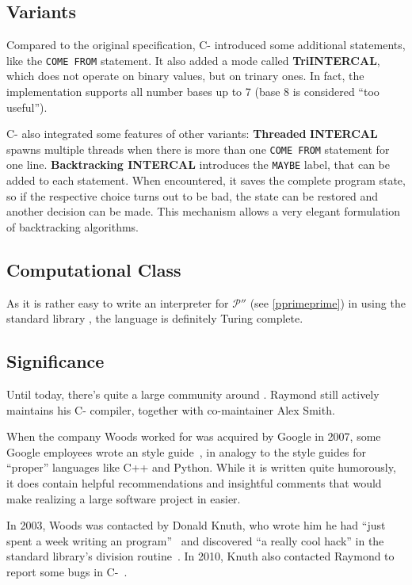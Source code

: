 \subsection{Variants}
\label{intercal-variants}

Compared to the original \ic{} specification, C-\ic{} introduced some additional statements, like the \texttt{COME FROM} statement. It also added a mode called \textbf{TriINTERCAL}, which does not operate on binary values, but on trinary ones. In fact, the implementation supports all number bases up to 7 (base 8 is considered “too useful”).

C-\ic{} also integrated some features of other \ic{} variants: \textbf{Threaded} \textbf{INTERCAL} spawns multiple threads when there is more than one \texttt{COME FROM} statement for one line. \textbf{Backtracking INTERCAL} introduces the \texttt{MAYBE} label, that can be added to each statement. When encountered, it saves the complete program state, so if the respective choice turns out to be bad, the state can be restored and another decision can be made. This mechanism allows a very elegant formulation of backtracking algorithms.

\subsection{Computational Class}

As it is rather easy to write an interpreter for $\mathcal{P}''$ (see \cref{pprimeprime}) in \ic{} using the standard library \cite{alksentrs2008intercal}, the language is definitely Turing complete.

\subsection{Significance}

Until today, there's quite a large community around \ic{}. Raymond still actively maintains his C-\ic{} compiler, together with co-maintainer Alex Smith.

When the company Woods worked for was acquired by Google in 2007, some Google employees wrote an \ic{} style guide~\cite{raiter2007google}, in analogy to the style guides for “proper” languages like C++ and Python. While it is written quite humorously, it does contain helpful recommendations and insightful comments that would make realizing a large software project in \ic{} easier.

In 2003, Woods was contacted by Donald Knuth, who wrote him he had “just spent a week writing an \ic{} program”~\cite{knuth2003tpk} and discovered “a really cool hack” in the standard library's division routine~\cite{hamilton2008az}. In 2010, Knuth also contacted Raymond to report some bugs in C-\ic{}~\cite{raymond2010donald}.
